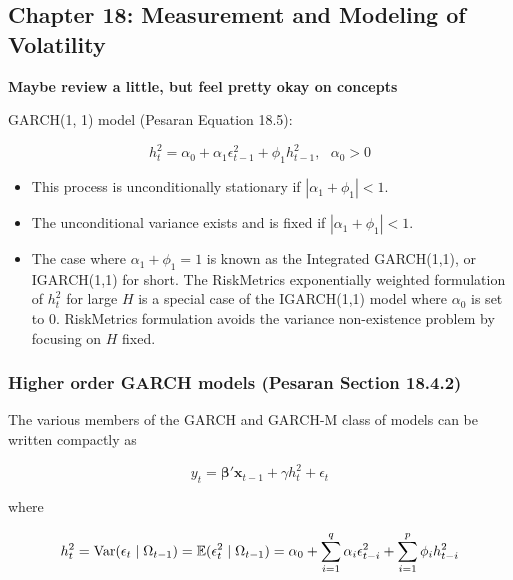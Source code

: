 %
%
%
%
%
%

\subsection{Chapter 18: Measurement and Modeling of Volatility}

\textbf{Maybe review a little, but feel pretty okay on concepts}

GARCH(1, 1) model (Pesaran Equation 18.5):

\begin{equation} \label{ts.eq.18.5}
h_t^2 = \alpha_0 + \alpha_1 \epsilon_{t-1}^2 + \phi_1 h_{t-1}^2, \ \ \ \alpha_0 > 0
\end{equation}

\begin{itemize}
\item This process is unconditionally stationary if \(|\alpha_1 + \phi_1| < 1\). 

\item The unconditional variance exists and is fixed if \(|\alpha_1 + \phi_1| < 1\). 

\item The case where \(\alpha_1 + \phi_1 = 1\) is known as the Integrated GARCH(1,1), or IGARCH(1,1) for short. The RiskMetrics exponentially weighted formulation of \(h_t^2\) for large \(H\) is a special case of the IGARCH(1,1) model where \(\alpha_0\) is set to 0. RiskMetrics formulation avoids the variance non-existence problem by focusing on \(H\) fixed.
\end{itemize}

\subsubsection{Higher order GARCH models (Pesaran Section 18.4.2)} The various members of the GARCH and GARCH-M class of models can be written compactly as

\begin{equation} \label{ts.eq.18.6}
y_t = \boldsymbol{\beta}' \boldsymbol{x}_{t-1} + \gamma h_t^2 + \epsilon_t
\end{equation}

where

\begin{equation} \label{ts.eq.18.7}
h_t^2 = \Var(\epsilon_t \mid \Omega_{t-1}) = \E(\epsilon_t^2 \mid \Omega_{t-1}) = \alpha_0 + \sum_{i=1}^q \alpha_i \epsilon_{t-i}^2 + \sum_{i=1}^p \phi_i h_{t-i}^2
\end{equation}

